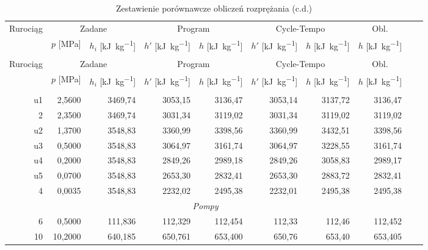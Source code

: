 \begin{longtable}{|*{10}{r|}}
	\caption{Zestawienie porównawcze obliczeń rozprężania}
	\label{test-wyniki2} \\

	\hline
		\multirow{2}{*}{Rurociąg} &
		\multicolumn{2}{c|}{Zadane} &
		\multicolumn{2}{c|}{Program} &
		\multicolumn{2}{c|}{Cycle-Tempo} &
		\multicolumn{1}{c|}{Obl.} \\
	\cline{2-8}
		&
		\multicolumn{1}{c|}{$p$ [\si{\mega\pascal}]} &
		\multicolumn{1}{c|}{$h_i$ [\si{\kilo\joule\per\kilogram}]} &
		\multicolumn{1}{c|}{$h'$ [\si{\kilo\joule\per\kilogram}]} &
		\multicolumn{1}{c|}{$h$ [\si{\kilo\joule\per\kilogram}]} &
		\multicolumn{1}{c|}{$h'$ [\si{\kilo\joule\per\kilogram}]} &
		\multicolumn{1}{c|}{$h$ [\si{\kilo\joule\per\kilogram}]} &
		\multicolumn{1}{c|}{$h$ [\si{\kilo\joule\per\kilogram}]} \\
	\hline
	\endfirsthead
	\caption{Zestawienie porównawcze obliczeń rozprężania (c.d.)} \\

	\hline
		\multirow{2}{*}{Rurociąg} &
		\multicolumn{2}{c|}{Zadane} &
		\multicolumn{2}{c|}{Program} &
		\multicolumn{2}{c|}{Cycle-Tempo} &
		\multicolumn{1}{c|}{Obl.} \\
	\cline{2-8}
		&
		\multicolumn{1}{c|}{$p$ [\si{\mega\pascal}]} &
		\multicolumn{1}{c|}{$h_i$ [\si{\kilo\joule\per\kilogram}]} &
		\multicolumn{1}{c|}{$h'$ [\si{\kilo\joule\per\kilogram}]} &
		\multicolumn{1}{c|}{$h$ [\si{\kilo\joule\per\kilogram}]} &
		\multicolumn{1}{c|}{$h'$ [\si{\kilo\joule\per\kilogram}]} &
		\multicolumn{1}{c|}{$h$ [\si{\kilo\joule\per\kilogram}]} &
		\multicolumn{1}{c|}{$h$ [\si{\kilo\joule\per\kilogram}]} \\
	\hline
	\endhead
	\hline
	\endfoot
		\multicolumn{8}{|c|}{\textit{Turbiny}} \\
	\hline
		u1 &  2,5600 & 3469,74 & 3053,15 & 3136,47 & 3053,14 & 3137,72 & 3136,47 \\
		 2 &  2,3500 & 3469,74 & 3031,34 & 3119,02 & 3031,34 & 3119,02 & 3119,02 \\
		u2 &  1,3700 & 3548,83 & 3360,99 & 3398,56 & 3360,99 & 3432,51 & 3398,56 \\
		u3 &  0,5000 & 3548,83 & 3064,97 & 3161,74 & 3064,97 & 3228,55 & 3161,74 \\
		u4 &  0,2000 & 3548,83 & 2849,26 & 2989,18 & 2849,26 & 3058,83 & 2989,17 \\
		u5 &  0,0700 & 3548,83 & 2653,30 & 2832,41 & 2653,30 & 2883,72 & 2832,41 \\
		 4 &  0,0035 & 3548,83 & 2232,02 & 2495,38 & 2232,01 & 2495,38 & 2495,38 \\
	\hline
		\multicolumn{8}{|c|}{\textit{Pompy}} \\
	\hline
		 6 &  0,5000 & 111,836 & 112,329 & 112,454 & 112,33 & 112,46 & 112,452 \\
		10 & 10,2000 & 640,185 & 650,761 & 653,400 & 650,76 & 653,40 & 653,405 \\
\end{longtable}

